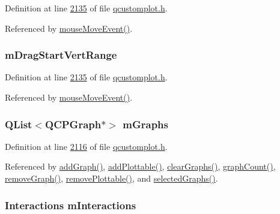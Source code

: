 Definition at line \hyperlink{a00116_source_l02135}{2135} of file \hyperlink{a00116_source}{qcustomplot.\+h}.



Referenced by \hyperlink{a00115_source_l07639}{mouse\+Move\+Event()}.

\hypertarget{a00116_aebb85632771d08a771605ccc5e0e0622}{
\subsubsection[{m\+Drag\+Start\+Vert\+Range}]{ m\+Drag\+Start\+Vert\+Range}}\label{a00116_aebb85632771d08a771605ccc5e0e0622}


Definition at line \hyperlink{a00116_source_l02135}{2135} of file \hyperlink{a00116_source}{qcustomplot.\+h}.



Referenced by \hyperlink{a00115_source_l07639}{mouse\+Move\+Event()}.

\hypertarget{a00116_a54ed2081d9366a6c2137bf9d9f7b8371}{
\subsubsection[{m\+Graphs}]{\setlength{\rightskip}{0pt plus 5cm}Q\+List$<${\bf Q\+C\+P\+Graph}$\ast$$>$ m\+Graphs}}\label{a00116_a54ed2081d9366a6c2137bf9d9f7b8371}


Definition at line \hyperlink{a00116_source_l02116}{2116} of file \hyperlink{a00116_source}{qcustomplot.\+h}.



Referenced by \hyperlink{a00115_source_l06688}{add\+Graph()}, \hyperlink{a00115_source_l06487}{add\+Plottable()}, \hyperlink{a00115_source_l06741}{clear\+Graphs()}, \hyperlink{a00115_source_l06754}{graph\+Count()}, \hyperlink{a00115_source_l06728}{remove\+Graph()}, \hyperlink{a00115_source_l06519}{remove\+Plottable()}, and \hyperlink{a00115_source_l06768}{selected\+Graphs()}.

\hypertarget{a00116_af8d040767753acc548b2368dd4150ae6}{
\subsubsection[{m\+Interactions}]{\setlength{\rightskip}{0pt plus 5cm}Interactions m\+Interactions}}\label{a00116_af8d040767753acc548b2368dd4150ae6}



